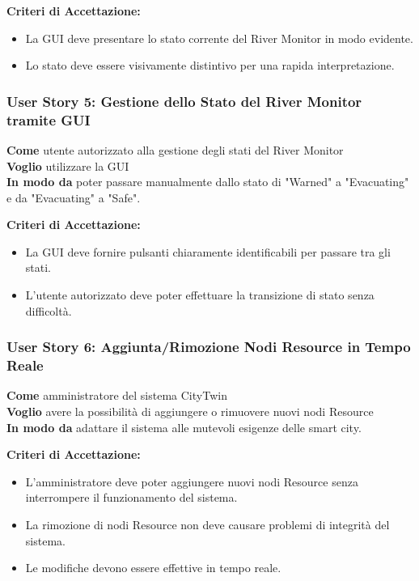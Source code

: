 \textbf{Criteri di Accettazione:}
\begin{itemize}
  \item La GUI deve presentare lo stato corrente del River Monitor in modo evidente.
  \item Lo stato deve essere visivamente distintivo per una rapida interpretazione.
\end{itemize}

\subsubsection{User Story 5: Gestione dello Stato del River Monitor tramite GUI}

\textbf{Come} utente autorizzato alla gestione degli stati del River Monitor \\
\textbf{Voglio} utilizzare la GUI \\
\textbf{In modo da}  poter passare manualmente dallo stato di "Warned" a "Evacuating" e da "Evacuating" a "Safe".

\textbf{Criteri di Accettazione:}
\begin{itemize}
  \item La GUI deve fornire pulsanti chiaramente identificabili per passare tra gli stati.
  \item L'utente autorizzato deve poter effettuare la transizione di stato senza difficoltà.
\end{itemize}

\subsubsection{User Story 6: Aggiunta/Rimozione Nodi Resource in Tempo Reale}

\textbf{Come} amministratore del sistema CityTwin \\
\textbf{Voglio} avere la possibilità di aggiungere o rimuovere nuovi nodi Resource \\
\textbf{In modo da} adattare il sistema alle mutevoli esigenze delle smart city.

\textbf{Criteri di Accettazione:}
\begin{itemize}
  \item L'amministratore deve poter aggiungere nuovi nodi Resource senza interrompere il funzionamento del sistema.
  \item La rimozione di nodi Resource non deve causare problemi di integrità del sistema.
  \item Le modifiche devono essere effettive in tempo reale.
\end{itemize}


